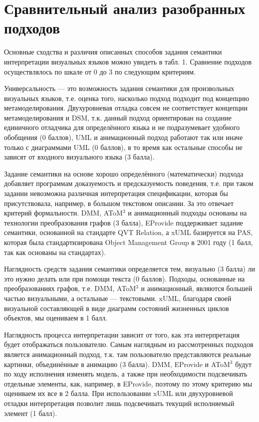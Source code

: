 \documentclass[a5paper]{article}
\begin{document}
\section{Сравнительный анализ разобранных подходов}

Основные сходства и различия описанных способов задания семантики интерпретации визуальных языков можно увидеть в табл. 1. Сравнение подходов осуществлялось по шкале от 0 до 3 по следующим критериям.

Универсальность --- это возможность задания семантики для произвольных визуальных языков, т.е. оценка того, насколько подход подходит под концепцию метамоделирования. Двухуровневая отладка совсем не соответствует концепции метамоделирования и DSM, т.к. данный подход ориентирован на создание единичного отладчика для определённого языка и не подразумевает удобного обобщения (0 баллов), UML и анимационный подход работают так или иначе только с диаграммами UML (0 баллов), в то время как остальные способы не зависят от входного визуального языка (3 балла).

Задание семантики на основе хорошо определённого (математически) подхода добавляет программам доказуемость и предсказуемость поведения, т.е. при таком задании невозможна различная интерпретация спецификации, которая бы присутствовала, например, в большом текстовом описании. За это отвечает критерий формальности. DMM, AToM$^3$ и анимационный подходы основаны на технологии преобразования графов (3 балла), EProvide поддерживает задание семантики, основанной на стандарте QVT Relation, а xUML базируется на PAS, которая была стандартизирована Object Management Group в 2001 году (1 балл, так как основаны на стандартах).
  
Наглядность средств задания семантики определяется тем, визуально (3 балла) ли это нужно делать или при помощи текста (0 баллов). Подходы, основанные на преобразованиях графов, т.е. DMM, AToM$^3$ и анимационный, являются большей частью визуальными, а остальные --- текстовыми. xUML, благодаря своей визуальной составляющей в виде диаграмм состояний жизненных циклов объектов, мы оцениваем в 1 балл.

Наглядность процесса интерпретации зависит от того, как эта интерпретация будет отображаться пользователю. Самым наглядным из рассмотренных подходов является анимационный подход, т.к. там пользователю представляются реальные картинки, объединённые в анимацию (3 балла). DMM, EProvide и AToM$^3$ будут по ходу исполнения изменять модель, а также при необходимости подсвечивать отдельные элементы, как, например, в EProvide, поэтому по этому критерию мы оцениваем их все в 2 балла. При использовании xUML или двухуровневой отладки интерпретация позволит лишь подсвечивать текущий исполняемый элемент (1 балл).
\end{document}
